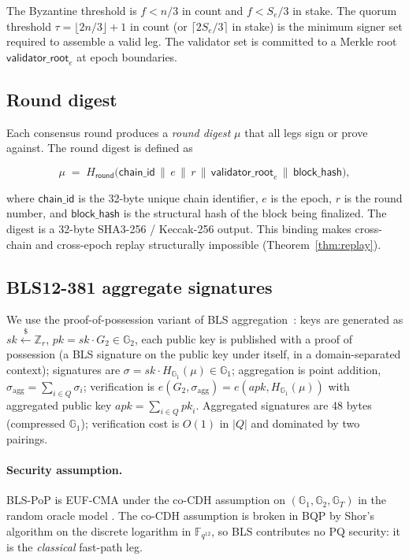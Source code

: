 The Byzantine threshold is $f < n/3$ in count and $f < S_e/3$ in
stake. The quorum threshold $\tau = \lfloor 2n/3 \rfloor + 1$ in count
(or $\lceil 2 S_e / 3 \rceil$ in stake) is the minimum signer set
required to assemble a valid leg. The validator set is committed to a
Merkle root $\mathsf{validator\_root}_e$ at epoch boundaries.

\subsection{Round digest}

Each consensus round produces a \emph{round digest} $\mu$ that all legs
sign or prove against. The round digest is defined as

\begin{equation}
\mu \;=\; H_{\mathsf{round}}\!\bigl(\mathsf{chain\_id}\,\|\, e\,\|\, r\,\|\,
\mathsf{validator\_root}_e\,\|\, \mathsf{block\_hash}\bigr),
\end{equation}

where $\mathsf{chain\_id}$ is the 32-byte unique chain identifier, $e$
is the epoch, $r$ is the round number, and $\mathsf{block\_hash}$ is
the structural hash of the block being finalized. The digest is a
32-byte SHA3-256 / Keccak-256 output. This binding makes cross-chain
and cross-epoch replay structurally impossible (Theorem~\ref{thm:replay}).

\subsection{BLS12-381 aggregate signatures}

We use the proof-of-possession variant of BLS aggregation~\cite{ietfbls,
boneh2001short,bonehshorth}: keys are generated as
$\mathit{sk} \xleftarrow{\$} \mathbb{Z}_r$,
$\mathit{pk} = \mathit{sk} \cdot G_2 \in \mathbb{G}_2$, each public
key is published with a proof of possession (a BLS signature on the
public key under itself, in a domain-separated context); signatures
are $\sigma = \mathit{sk} \cdot H_{\mathbb{G}_1}(\mu) \in \mathbb{G}_1$;
aggregation is point addition, $\sigma_{\mathrm{agg}} = \sum_{i \in Q}
\sigma_i$; verification is
$e(G_2, \sigma_{\mathrm{agg}}) = e(\mathit{apk}, H_{\mathbb{G}_1}(\mu))$
with aggregated public key $\mathit{apk} = \sum_{i \in Q} \mathit{pk}_i$.
Aggregated signatures are 48 bytes (compressed $\mathbb{G}_1$);
verification cost is $O(1)$ in $|Q|$ and dominated by two pairings.

\paragraph{Security assumption.}
BLS-PoP is EUF-CMA under the co-CDH assumption on
$(\mathbb{G}_1, \mathbb{G}_2, \mathbb{G}_T)$ in the random oracle
model \cite{boneh2001short,boldyreva2003,bonehshorth}. The co-CDH
assumption is broken in BQP by Shor's algorithm on the discrete
logarithm in $\mathbb{F}_{q^{12}}$, so BLS contributes no PQ
security: it is the \emph{classical} fast-path leg.

